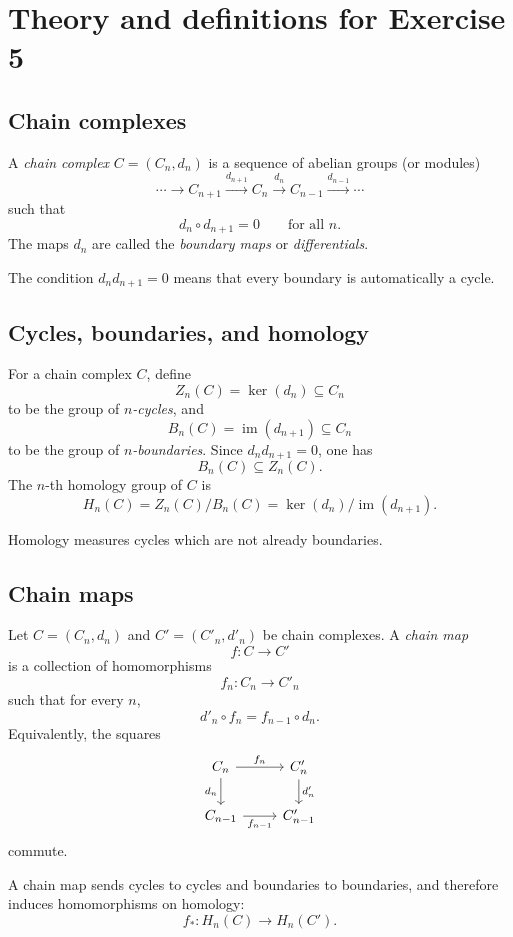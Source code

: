 \documentclass[12pt,a4paper]{article}
\theoremstyle{notespace}
\begin{document}
\section{Theory and definitions for Exercise 5}

\subsection{Chain complexes}

A \emph{chain complex} \(C=(C_n,d_n)\) is a sequence of abelian groups (or modules)
\[
\cdots \longrightarrow C_{n+1}\xrightarrow{d_{n+1}} C_n\xrightarrow{d_n} C_{n-1}\xrightarrow{d_{n-1}} \cdots
\]
such that
\[
d_n\circ d_{n+1}=0
\qquad\text{for all }n.
\]
The maps \(d_n\) are called the \emph{boundary maps} or \emph{differentials}.

The condition \(d_n d_{n+1}=0\) means that every boundary is automatically a cycle.

\subsection{Cycles, boundaries, and homology}

For a chain complex \(C\), define
\[
Z_n(C)=\ker(d_n)\subseteq C_n
\]
to be the group of \emph{\(n\)-cycles}, and
\[
B_n(C)=\operatorname{im}(d_{n+1})\subseteq C_n
\]
to be the group of \emph{\(n\)-boundaries}. Since \(d_n d_{n+1}=0\), one has
\[
B_n(C)\subseteq Z_n(C).
\]
The \(n\)-th homology group of \(C\) is
\[
H_n(C)=Z_n(C)/B_n(C)=\ker(d_n)/\operatorname{im}(d_{n+1}).
\]

Homology measures cycles which are not already boundaries.

\subsection{Chain maps}

Let \(C=(C_n,d_n)\) and \(C'=(C'_n,d'_n)\) be chain complexes. A \emph{chain map}
\[
f:C\to C'
\]
is a collection of homomorphisms
\[
f_n:C_n\to C'_n
\]
such that for every \(n\),
\[
d'_n\circ f_n=f_{n-1}\circ d_n.
\]
Equivalently, the squares
\[
\begin{tikzcd}
	C_n \arrow[r,"f_n"] \arrow[d,"d_n"'] & C'_n \arrow[d,"d'_n"] \\
	C_{n-1} \arrow[r,"f_{n-1}"'] & C'_{n-1}
\end{tikzcd}
\]
commute.

A chain map sends cycles to cycles and boundaries to boundaries, and therefore induces homomorphisms on homology:
\[
f_*:H_n(C)\to H_n(C').
\]
\end{document}
